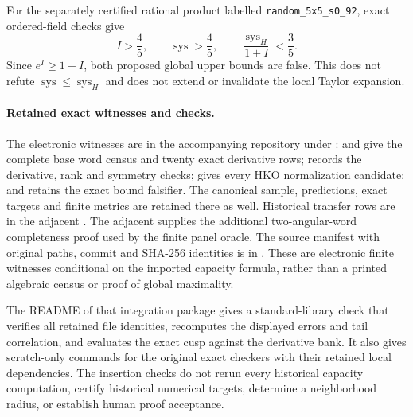 For the separately certified rational product labelled
\texttt{random\_5x5\_s0\_92}, exact ordered-field checks give
\[
 I>\frac45,\qquad \operatorname{sys}>\frac45,\qquad
 \frac{\operatorname{sys}_H}{1+I}<\frac35.
\]
Since $e^I\geq1+I$, both proposed global upper bounds are false.
This does not refute $\operatorname{sys}\leq\operatorname{sys}_H$ and does not extend
or invalidate the local Taylor expansion.


\paragraph{Retained exact witnesses and checks.}
\begingroup\raggedright
The electronic witnesses are in the accompanying repository under
:
 and  give the complete base
word census and twenty exact derivative rows;
 records the derivative, rank and symmetry checks;
 gives every HKO normalization candidate;
and  retains the exact bound falsifier.
The canonical sample, predictions, exact targets and finite metrics are
retained there as well. Historical transfer rows are in the adjacent
. The adjacent
 supplies the additional
two-angular-word completeness proof used by the finite panel oracle.
The source manifest with original paths, commit and SHA-256 identities is in
.
These are electronic finite
witnesses conditional on the imported capacity formula, rather than a
printed algebraic census or proof of global maximality.\par
\endgroup

The README of that integration package gives a standard-library check that verifies all retained
file identities, recomputes the displayed errors and tail correlation,
and evaluates the exact cusp against the derivative bank. It also gives
scratch-only commands for the original exact checkers with their retained
local dependencies. The insertion checks do not rerun every historical
capacity computation, certify historical numerical targets, determine a
neighborhood radius, or establish human proof acceptance.
